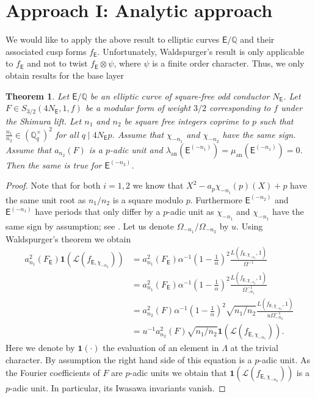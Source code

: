 \documentclass{amsart}
\newcommand{\DK}[1]{\textcolor{purple}{#1}}
\newcommand{\KM}[1]{\textcolor{OliveGreen}{#1}}
\newtheorem{theorem}{Theorem}[section]
\numberwithin{equation}{section}
\theoremstyle{remark}
\newcommand{\an}{\operatorname{an}}
\newcommand{\Q}{\mathbb{Q}}
\newcommand{\EC}{\mathsf{E}}
\theoremstyle{plain} %
\begin{document}
\section{Approach I: Analytic approach}
\label{sec: approach 1}

We would like to apply {the above} result to elliptic curves $\EC/\Q$ and their associated cusp forms $f_{\EC}$. Unfortunately, Waldspurger's result is only applicable to $f_{\EC}$ and not to twist $f_{\EC}\otimes \psi$, where $\psi$ is a finite order character. Thus, we only obtain results for the base layer

\begin{theorem}
\label{thm.analytic twist}
Let $\EC/\Q$ be an elliptic curve of square-free odd conductor {$N_{\EC}$}.
Let $F\in S_{3/2}(4N_{{\EC}},1,f)$ be a modular form of weight $3/2$ corresponding to $f$ under the Shimura lift.
Let $n_1$ and $n_2$ be square free integers coprime to $p$ such that $\frac{n_1}{n_2}\in (\Q_q^\times)^2$ for all $q\mid 4N_{\EC}p$.
Assume that $\chi_{-n_1}$ and $\chi_{-n_2}$ have the same sign.
Assume that $a_{n_2}(F)$ is a $p$-adic unit and $\lambda_{\an}(\EC^{(-n_1)})=\mu_{\an}(\EC^{(-n_1)})=0$.
Then the same is true for $\EC^{(-n_2)}$.
\end{theorem}

\begin{proof}
Note that for both $i=1,2$ we know that $X^2-a_p\chi_{-n_i}(p)(X)+p$ have the same unit root as $n_1/n_2$ is a square modulo $p$.
Furthermore $\EC^{(-n_2)}$ and $\EC^{(-n_1)}$ have periods that only differ by a $p$-adic unit as $\chi_{-n_1}$ and $\chi_{-n_1}$ have the same sign {by assumption}; {see} \cite[page 40]{MTT}.
{Let us} denote $\Omega_{-n_1}/\Omega_{-n_2}$ by $u$.
Using Waldspurger's theorem we obtain %
\begin{align*}
a^{2}_{n_1}(F_{\EC})\mathbf{1}(\mathcal{L}(f_{\EC,\chi_{-n_2}}))& = a^{2}_{n_1}(F_{\EC})\alpha^{-1}\left(1-\frac{1}{\alpha}\right)^2\frac{L(f_{\EC,\chi_{-n_2}},1)}{\Omega^{-1}}\\
&= a^{2}_{n_1}(F_{\EC})\alpha^{-1}\left(1-\frac{1}{\alpha}\right)^2\frac{L(f_{\EC,\chi_{-n_2}},1)}{\Omega_{-n_1}^{-1}}\\
&=a_{n_2}^2(F)\alpha^{-1}\left(1-\frac{1}{\alpha}\right)^2\sqrt{n_1/n_2}\frac{L(f_{\EC,\chi_{-n_2}},1)}{u\Omega_{-n_2}^{-1}}\\
&=u^{-1}a_{n_2}^2(F)\sqrt{n_1/n_2}\mathbf{1}(\mathcal{L}(f_{\EC,\chi_{-n_1}})).
\end{align*}
Here we denote by $\mathbf{1}(\cdot)$ the evaluation of an element in $\Lambda$ at the trivial character. 
By assumption the right hand side of this equation is a $p$-adic unit. As the Fourier coefficients of $F$ are $p$-adic units we obtain that $\mathbf{1}(\mathcal{L}(f_{\EC,\chi_{-n_2}}))$ is a $p$-adic unit. In particular, its Iwasawa invariants vanish.
\end{proof}
\end{document}
